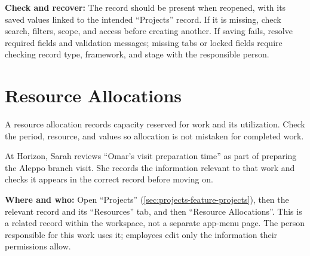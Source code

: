 \textbf{Check and recover:} The record should be present when reopened, with its saved values linked to the intended “Projects” record. If it is missing, check search, filters, scope, and access before creating another. If saving fails, resolve required fields and validation messages; missing tabs or locked fields require checking record type, framework, and stage with the responsible person.

\clearpage
\section{Resource Allocations}
\label{sec:projects-feature-resource-allocations}

A resource allocation records capacity reserved for work and its utilization. Check the period, resource, and values so allocation is not mistaken for completed work.

\begin{rcnote}
At Horizon, Sarah reviews “Omar's visit preparation time” as part of preparing the Aleppo branch visit. She records the information relevant to that work and checks it appears in the correct record before moving on.
\end{rcnote}

\textbf{Where and who:} Open “Projects” (\ref{sec:projects-feature-projects}), then the relevant record and its “Resources” tab, and then “Resource Allocations”. This is a related record within the workspace, not a separate app-menu page. The person responsible for this work uses it; employees edit only the information their permissions allow.

